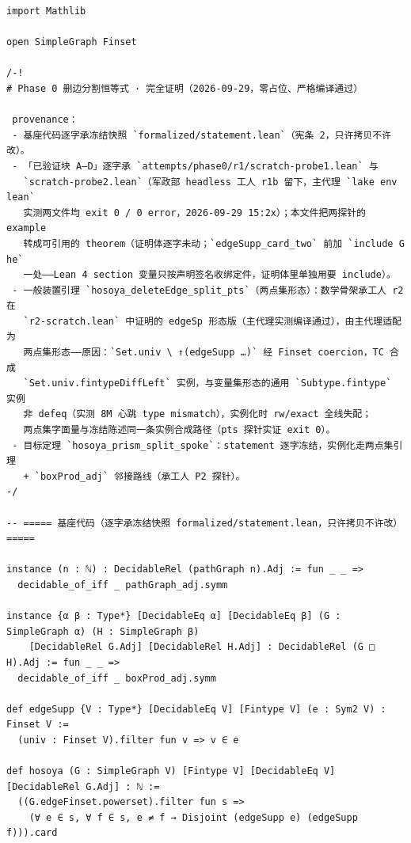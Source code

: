 \documentclass[11pt]{article}
\theoremstyle{definition}
\begin{document}
\begin{lstlisting}[basicstyle=\ttfamily\footnotesize,caption={Complete proof
file of Lemma~\ref{lem:split} and Theorem~\ref{thm:prismsplit}, verbatim lines
1--429 (whole file) of \texttt{attempts/phase0/r2/split-identity.lean} (sha256
\texttt{d2efac51}).},label={lst:proof}]
import Mathlib

open SimpleGraph Finset

/-!
# Phase 0 删边分割恒等式 · 完全证明（2026-09-29，零占位、严格编译通过）

 provenance：
 - 基座代码逐字承冻结快照 `formalized/statement.lean`（宪条 2，只许拷贝不许改）。
 - 「已验证块 A–D」逐字承 `attempts/phase0/r1/scratch-probe1.lean` 与
   `scratch-probe2.lean`（军政部 headless 工人 r1b 留下，主代理 `lake env lean`
   实测两文件均 exit 0 / 0 error，2026-09-29 15:2x）；本文件把两探针的 example
   转成可引用的 theorem（证明体逐字未动；`edgeSupp_card_two` 前加 `include G he`
   一处——Lean 4 section 变量只按声明签名收绑定件，证明体里单独用要 include）。
 - 一般装置引理 `hosoya_deleteEdge_split_pts`（两点集形态）：数学骨架承工人 r2 在
   `r2-scratch.lean` 中证明的 edgeSp 形态版（主代理实测编译通过），由主代理适配为
   两点集形态——原因：`Set.univ \ ↑(edgeSupp …)` 经 Finset coercion，TC 合成
   `Set.univ.fintypeDiffLeft` 实例，与变量集形态的通用 `Subtype.fintype` 实例
   非 defeq（实测 8M 心跳 type mismatch），实例化时 rw/exact 全线失配；
   两点集字面量与冻结陈述同一条实例合成路径（pts 探针实证 exit 0）。
 - 目标定理 `hosoya_prism_split_spoke`：statement 逐字冻结，实例化走两点集引理
   + `boxProd_adj` 邻接路线（承工人 P2 探针）。
-/

-- ===== 基座代码（逐字承冻结快照 formalized/statement.lean，只许拷贝不许改） =====

instance (n : ℕ) : DecidableRel (pathGraph n).Adj := fun _ _ =>
  decidable_of_iff _ pathGraph_adj.symm

instance {α β : Type*} [DecidableEq α] [DecidableEq β] (G : SimpleGraph α) (H : SimpleGraph β)
    [DecidableRel G.Adj] [DecidableRel H.Adj] : DecidableRel (G □ H).Adj := fun _ _ =>
  decidable_of_iff _ boxProd_adj.symm

def edgeSupp {V : Type*} [DecidableEq V] [Fintype V] (e : Sym2 V) : Finset V :=
  (univ : Finset V).filter fun v => v ∈ e

def hosoya (G : SimpleGraph V) [Fintype V] [DecidableEq V] [DecidableRel G.Adj] : ℕ :=
  ((G.edgeFinset.powerset).filter fun s =>
    (∀ e ∈ s, ∀ f ∈ s, e ≠ f → Disjoint (edgeSupp e) (edgeSupp f))).card


\end{lstlisting}
\end{document}
